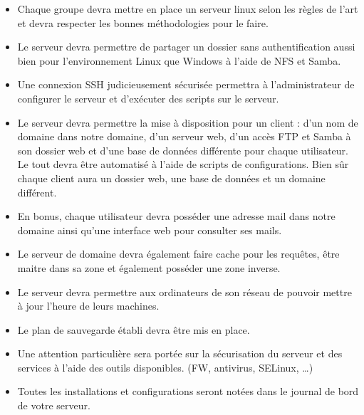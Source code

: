 \documentclass{article}
\begin{document}
\begin{itemize}
\item Chaque groupe devra mettre en place un serveur linux selon les règles de l’art et devra respecter les bonnes méthodologies pour le faire.
\item Le serveur devra permettre de partager un dossier sans authentification aussi bien pour l’environnement Linux que Windows à l’aide de NFS et Samba.
\item Une connexion SSH judicieusement sécurisée permettra à l’administrateur de configurer le serveur et d’exécuter des scripts sur le serveur.
\item Le serveur devra permettre la mise à disposition pour un client : d’un nom de domaine dans notre domaine, d’un serveur web, d’un accès FTP et Samba à son dossier web et d’une base de données différente pour chaque utilisateur. Le tout devra être automatisé à l’aide de scripts de configurations. Bien sûr chaque client aura un dossier web, une base de données et un domaine différent.
\item En bonus, chaque utilisateur devra posséder une adresse mail dans notre domaine ainsi qu’une interface web pour consulter ses mails.
\item Le serveur de domaine devra également faire cache pour les requêtes, être maitre dans sa zone et également posséder une zone inverse.
\item Le serveur devra permettre aux ordinateurs de son réseau de pouvoir mettre à jour l’heure de leurs machines.
\item Le plan de sauvegarde établi devra être mis en place.
\item Une attention particulière sera portée sur la sécurisation du serveur et des services à l’aide des outils disponibles. (FW, antivirus, SELinux, …)
\item Toutes les installations et configurations seront notées dans le journal de bord de votre serveur.
		
\end{itemize}
	
\newpage	
	
\end{document}
